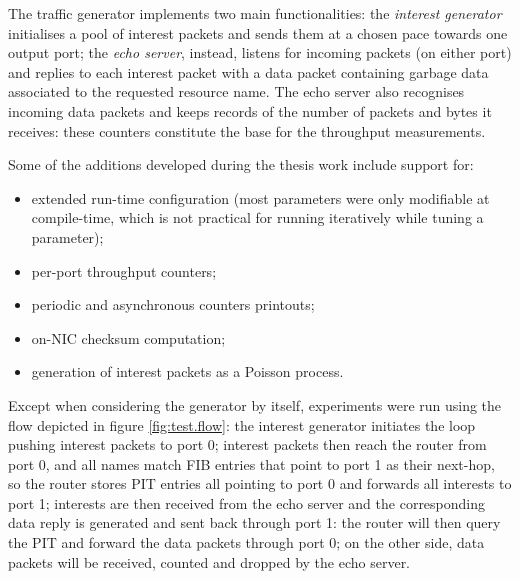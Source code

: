 \documentclass[11pt,a4paper,twoside,titlepage,openany]{book}
\begin{document}
The traffic generator implements two main functionalities: the \emph{interest generator} initialises a pool of interest packets and sends them at a chosen pace towards one output port; the \emph{echo server}, instead, listens for incoming packets (on either port) and replies to each interest packet with a data packet containing garbage data associated to the requested resource name. The echo server also recognises incoming data packets and keeps records of the number of packets and bytes it receives: these counters constitute the base for the throughput measurements.

Some of the additions developed during the thesis work include support for:
\begin{itemize}[noitemsep,nolistsep]
  \item extended run-time configuration (most parameters were only modifiable at compile-time, which is not practical for running iteratively while tuning a parameter);
  \item per-port throughput counters;
  \item periodic and asynchronous counters printouts;
  \item on-NIC checksum computation;
  \item generation of interest packets as a Poisson process.
\end{itemize}

Except when considering the generator by itself, experiments were run using the flow depicted in figure \ref{fig:test.flow}: the interest generator initiates the loop pushing interest packets to port 0; interest packets then reach the router from port 0, and all names match \gls{FIB} entries that point to port 1 as their next-hop, so the router stores \gls{PIT} entries all pointing to port 0 and forwards all interests to port 1; interests are then received from the echo server and the corresponding data reply is generated and sent back through port 1: the router will then query the \gls{PIT} and forward the data packets through port 0; on the other side, data packets will be received, counted and dropped by the echo server.
 
\end{document}
